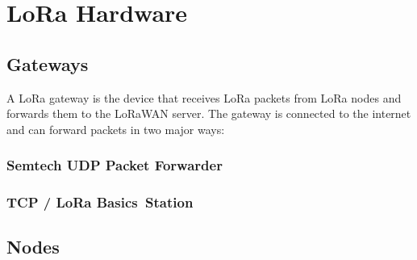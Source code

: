 \section{\ac{LoRa} Hardware}

\subsection{Gateways}

A \ac{LoRa} gateway is the device that receives \ac{LoRa} packets from \ac{LoRa} nodes and forwards them to the \ac{LoRaWAN} server.
The gateway is connected to the internet and can forward packets in two major ways:

\subsubsection{Semtech \acs{UDP} Packet Forwarder}


\subsubsection{\acf{TCP} / LoRa Basics\texttrademark~Station}


\subsection{Nodes}